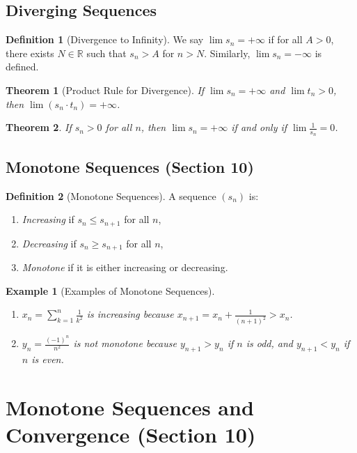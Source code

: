 \documentclass[9pt]{article}
\theoremstyle{definition}
\newtheorem{definition}{Definition}
\theoremstyle{plain}
\newtheorem{theorem}{Theorem}
\newtheorem{example}{Example}
\begin{document}
\subsection*{Diverging Sequences}
\begin{definition}[Divergence to Infinity]
We say $ \lim s_n = +\infty $ if for all $ A > 0 $, there exists $ N \in \mathbb{R} $ such that $ s_n > A $ for $ n > N $. Similarly, $ \lim s_n = -\infty $ is defined.
\end{definition}

\begin{theorem}[Product Rule for Divergence]
If $ \lim s_n = +\infty $ and $ \lim t_n > 0 $, then $ \lim (s_n \cdot t_n) = +\infty $.
\end{theorem}

\begin{theorem}
If $ s_n > 0 $ for all $ n $, then $ \lim s_n = +\infty $ if and only if $ \lim \frac{1}{s_n} = 0 $.
\end{theorem}

\subsection*{Monotone Sequences (Section 10)}
\begin{definition}[Monotone Sequences]
A sequence $ (s_n) $ is:
\begin{enumerate}
    \item \textit{Increasing} if $ s_n \leq s_{n+1} $ for all $ n $,
    \item \textit{Decreasing} if $ s_n \geq s_{n+1} $ for all $ n $,
    \item \textit{Monotone} if it is either increasing or decreasing.
\end{enumerate}
\end{definition}

\begin{example}[Examples of Monotone Sequences]

\begin{enumerate}
    \item $ x_n = \sum_{k=1}^n \frac{1}{k^2} $ is increasing because $ x_{n+1} = x_n + \frac{1}{(n+1)^2} > x_n $.
    \item $ y_n = \frac{(-1)^n}{n^2} $ is not monotone because $ y_{n+1} > y_n $ if $ n $ is odd, and $ y_{n+1} < y_n $ if $ n $ is even.
\end{enumerate}
\end{example}
\section*{Monotone Sequences and Convergence (Section 10)}
\end{document}
